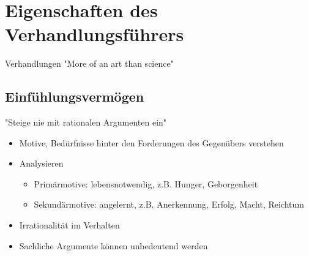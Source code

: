 

\section{Eigenschaften des Verhandlungsführers}


\begin{frame}{Verhandlungen}
  "More of an art than science" \cite[][p.12]{mccarthy_advanced_2015}


\end{frame}

\subsection{Einfühlungsvermögen}

\begin{frame}
  "Steige nie mit rationalen Argumenten ein" \cite{obermeier_karrieresprung_nodate}
\end{frame}

\begin{frame}
  \begin{itemize}
    \item Motive, Bedürfnisse hinter den Forderungen des Gegenübers verstehen \cites{mccarthy_advanced_2015}[p. 106]{wannenwetsch_erfolgreicher_2009}
  \item Analysieren \cite[][4.4.2]{helmold_verhandlungskonzepte_2019} \begin{itemize}
	  \item Primärmotive: lebensnotwendig, z.B. Hunger, Geborgenheit
	  \item Sekundärmotive: angelernt, z.B. Anerkennung, Erfolg, Macht, Reichtum
	\end{itemize}
  \item Irrationalität im Verhalten \cite[][p. 12]{mccarthy_advanced_2015}
  \item Sachliche Argumente können unbedeutend werden 
  \end{itemize}
	  

\end{frame}


